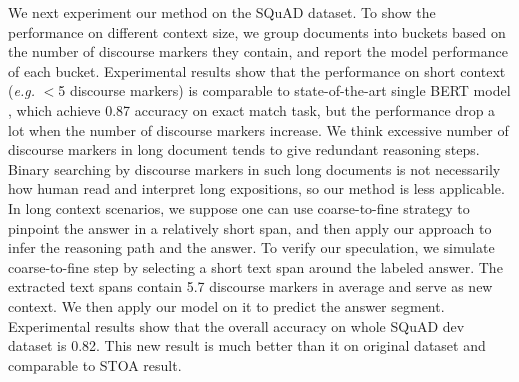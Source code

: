  We next experiment our method on the SQuAD dataset. To show the performance on different context size, we group documents into buckets based on the number of discourse markers they contain, and report the model performance of each bucket. Experimental results show that the performance on short context (\emph{e.g.} $<$5 discourse markers) is comparable to state-of-the-art single BERT model \cite{DBLP:journals/corr/abs-1810-04805}, which achieve 0.87 accuracy on exact match task, but the performance drop a lot when the number of discourse markers increase. We think excessive number of discourse markers in long document tends to give redundant reasoning steps. Binary searching by discourse markers in such long documents is not necessarily how human read and interpret long expositions, so our method is less applicable. In long context scenarios, we suppose one can use coarse-to-fine strategy to pinpoint the answer in a relatively short span, and then apply our approach to infer the reasoning path and the answer. To verify our speculation, we simulate coarse-to-fine step by selecting a short text span around the labeled answer. The extracted text spans contain 5.7 discourse markers in average and serve as new context. We then apply our model on it to predict the answer segment. Experimental results show that the overall accuracy on whole SQuAD dev dataset is 0.82. This new result is much better than it on original dataset and comparable to STOA result. 